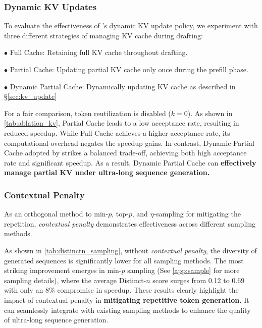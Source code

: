 \subsubsection{Dynamic KV Updates}
To evaluate the effectiveness of \ours's dynamic KV update policy, we experiment with three different strategies of managing KV cache during drafting:

$\bullet$ Full Cache: Retaining full KV cache throughout drafting.

$\bullet$ Partial Cache: Updating partial KV cache only once during the prefill phase.

$\bullet$ Dynamic Partial Cache: Dynamically updating KV cache as described in \S \ref{sec:kv_update}


For a fair comparison, token reutilization is disabled (\ie $k=0$). As shown in \cref{tab:ablation_kv}, Partial Cache leads to a low acceptance rate, resulting in reduced speedup. While Full Cache achieves a higher acceptance rate, its computational overhead negates the speedup gains. In contrast, Dynamic Partial Cache adopted by \ours strikes a balanced trade-off, achieving both high acceptance rate and significant speedup. As a result, Dynamic Partial Cache can \textbf{effectively manage partial KV under ultra-long sequence generation.}

\subsubsection{Contextual Penalty}
As an orthogonal method to min-$p$, top-$p$, and $\eta$-sampling for mitigating the repetition, \textit{contextual penalty} demonstrates effectiveness across different sampling methods. 


As shown in \cref{tab:distinctn_sampling}, without \textit{contextual penalty}, the diversity of generated sequences is significantly lower for all sampling methods. The most striking improvement emerges in min-$p$ sampling (See \cref{app:sample} for more sampling details), where the average Distinct-$n$ score surges from 0.12 to 0.69 with only an 8\% compromise in speedup. These results clearly highlight the impact of contextual penalty in \textbf{mitigating repetitive token generation.} It can seamlessly integrate with existing sampling methods to enhance the quality of ultra-long sequence generation.

